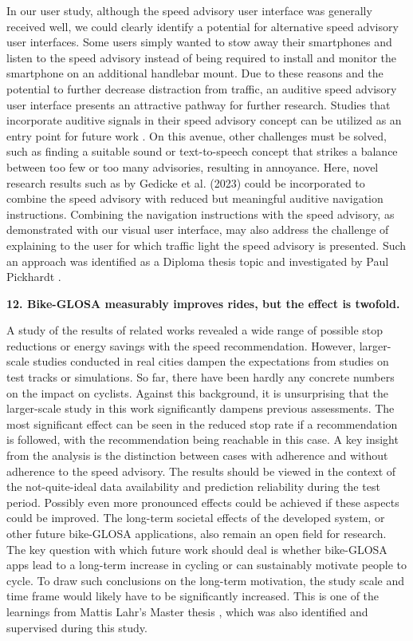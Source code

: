 In our user study, although the speed advisory user interface was generally received well, we could clearly identify a potential for alternative speed advisory user interfaces. Some users simply wanted to stow away their smartphones and listen to the speed advisory instead of being required to install and monitor the smartphone on an additional handlebar mount. Due to these reasons and the potential to further decrease distraction from traffic, an auditive speed advisory user interface presents an attractive pathway for further research. Studies that incorporate auditive signals in their speed advisory concept can be utilized as an entry point for future work \cite{suramardhana_driver-centric_2014, xu_bb_2015, wilson_driver_2017, sokolov_effects_2018, zhang_green_2020, chen_developing_2022}. On this avenue, other challenges must be solved, such as finding a suitable sound or text-to-speech concept that strikes a balance between too few or too many advisories, resulting in annoyance. Here, novel research results such as by Gedicke et al. (2023) \cite{gedicke_selecting_2023} could be incorporated to combine the speed advisory with reduced but meaningful auditive navigation instructions. Combining the navigation instructions with the speed advisory, as demonstrated with our visual user interface, may also address the challenge of explaining to the user for which traffic light the speed advisory is presented. Such an approach was identified as a Diploma thesis topic and investigated by Paul Pickhardt \cite{pickhardt_2023}.

\textbf{\color{cidarkblue}12. Bike-GLOSA measurably improves rides, but the effect is twofold.} 

A study of the results of related works revealed a wide range of possible stop reductions or energy savings with the speed recommendation. However, larger-scale studies conducted in real cities dampen the expectations from studies on test tracks or simulations. So far, there have been hardly any concrete numbers on the impact on cyclists. Against this background, it is unsurprising that the larger-scale study in this work significantly dampens previous assessments. The most significant effect can be seen in the reduced stop rate if a recommendation is followed, with the recommendation being reachable in this case. A key insight from the analysis is the distinction between cases with adherence and without adherence to the speed advisory. The results should be viewed in the context of the not-quite-ideal data availability and prediction reliability during the test period. Possibly even more pronounced effects could be achieved if these aspects could be improved. The long-term societal effects of the developed system, or other future bike-GLOSA applications, also remain an open field for research. The key question with which future work should deal is whether bike-GLOSA apps lead to a long-term increase in cycling or can sustainably motivate people to cycle. To draw such conclusions on the long-term motivation, the study scale and time frame would likely have to be significantly increased. This is one of the learnings from Mattis Lahr's Master thesis \cite{lahr_2023}, which was also identified and supervised during this study.


